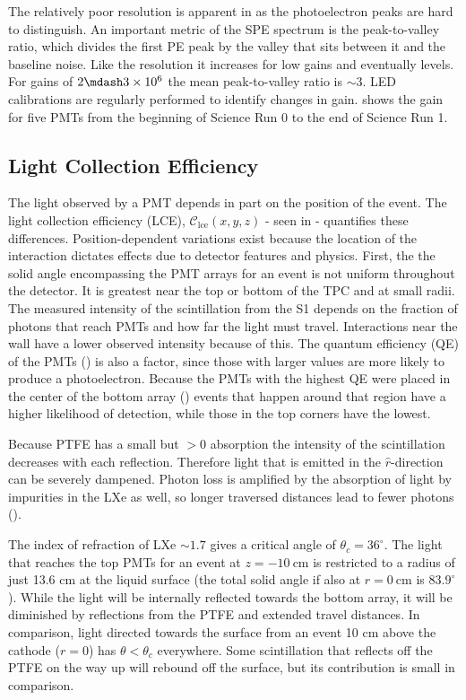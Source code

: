 The relatively poor resolution is apparent in  as the photoelectron peaks are hard to distinguish.  An
important metric of the SPE spectrum is the peak-to-valley ratio, which divides the first PE peak by the valley that sits between it and
the baseline noise.  Like the resolution it increases for low gains and eventually levels.  For gains of $2 \mdash 3 \times 10^{6}$ the
mean peak-to-valley ratio is ${\sim} 3$.  LED calibrations are regularly performed to identify changes in
gain.   shows the gain for five PMTs from the beginning of Science Run 0 to the end of Science Run 1.



\subsection{Light Collection Efficiency}
\label{subsec:det_char_lce}
The light observed by a PMT depends in part on the position of the event.  The light collection efficiency (LCE),
$\mathcal{C}_{\mathrm{lce}}(x, y, z)$ - seen in  - quantifies these differences.  Position-dependent
variations exist because the location of
the interaction dictates effects due to detector features and physics.  First, the the solid angle encompassing the PMT arrays
for an event is not uniform
throughout the detector.  It is greatest near the top or bottom of the TPC and at small radii.  The measured intensity of the
scintillation
from the S1 depends on the fraction of photons that reach PMTs and how far the light must travel.  Interactions near the
wall have a lower observed intensity because of this.  The quantum efficiency (QE) of the PMTs () is also a
factor, since those with larger values are more likely to produce a photoelectron.  Because the PMTs with the highest QE were placed in
the
center of the bottom array () events that happen around that region have a higher likelihood of detection,
while those in the top corners have the lowest.

Because PTFE has a small but $> 0$ absorption the intensity of the scintillation decreases with each reflection.  Therefore light
that is emitted in the $\hat{r}$-direction can be severely dampened.  Photon loss is amplified by the absorption of light by
impurities in the LXe as well, so longer traversed distances lead to fewer photons ().

The index of refraction of LXe ${\sim} 1.7$
gives a critical angle of $\theta_c = 36^{\circ}$.  The light that reaches the top PMTs for an event at
$z = -10\ \mathrm{cm}$ is restricted to a radius of just 13.6 cm at the liquid surface (the total solid angle if also at
$r = 0\ \mathrm{cm}$ is $83.9^{\circ}$).  While the light will be internally reflected towards the bottom array, it will
be diminished by reflections from the PTFE and extended travel distances. In comparison, light
directed towards the surface from an event 10 cm above the cathode ($r = 0$)
has $\theta < \theta_c$ everywhere.  Some scintillation that reflects off the PTFE on the way up will rebound off the surface, but its
contribution is small in comparison.

